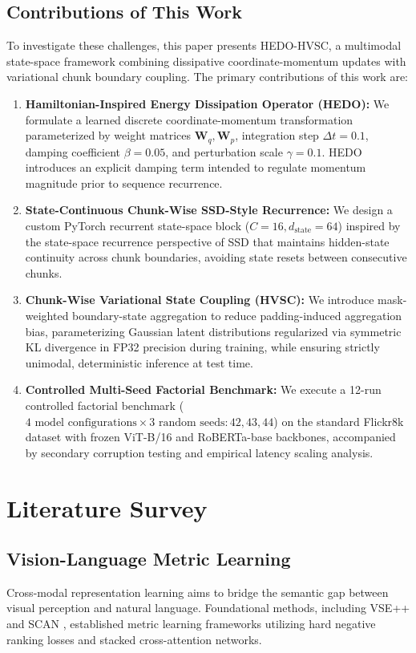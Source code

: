 \documentclass[journal]{IEEEtran}
\begin{document}
\subsection{Contributions of This Work}
To investigate these challenges, this paper presents HEDO-HVSC, a multimodal state-space framework combining dissipative coordinate-momentum updates with variational chunk boundary coupling. The primary contributions of this work are:
\begin{enumerate}
    \item \textbf{Hamiltonian-Inspired Energy Dissipation Operator (HEDO):} We formulate a learned discrete coordinate-momentum transformation parameterized by weight matrices $\mathbf{W}_q, \mathbf{W}_p$, integration step $\Delta t=0.1$, damping coefficient $\beta=0.05$, and perturbation scale $\gamma=0.1$. HEDO introduces an explicit damping term intended to regulate momentum magnitude prior to sequence recurrence.
    \item \textbf{State-Continuous Chunk-Wise SSD-Style Recurrence:} We design a custom PyTorch recurrent state-space block ($C=16, d_{\text{state}}=64$) inspired by the state-space recurrence perspective of SSD that maintains hidden-state continuity across chunk boundaries, avoiding state resets between consecutive chunks.
    \item \textbf{Chunk-Wise Variational State Coupling (HVSC):} We introduce mask-weighted boundary-state aggregation to reduce padding-induced aggregation bias, parameterizing Gaussian latent distributions regularized via symmetric KL divergence in FP32 precision during training, while ensuring strictly unimodal, deterministic inference at test time.
    \item \textbf{Controlled Multi-Seed Factorial Benchmark:} We execute a 12-run controlled factorial benchmark ($4\text{ model configurations} \times 3\text{ random seeds}: 42, 43, 44$) on the standard Flickr8k dataset \cite{hodosh2013framing} with frozen ViT-B/16 and RoBERTa-base backbones, accompanied by secondary corruption testing and empirical latency scaling analysis.
\end{enumerate}

\section{Literature Survey}
\label{sec:literature_survey}

\subsection{Vision-Language Metric Learning}
Cross-modal representation learning aims to bridge the semantic gap between visual perception and natural language. Foundational methods, including VSE++ \cite{faghri2017vse++} and SCAN \cite{lee2018stacked}, established metric learning frameworks utilizing hard negative ranking losses and stacked cross-attention networks. 
\end{document}
